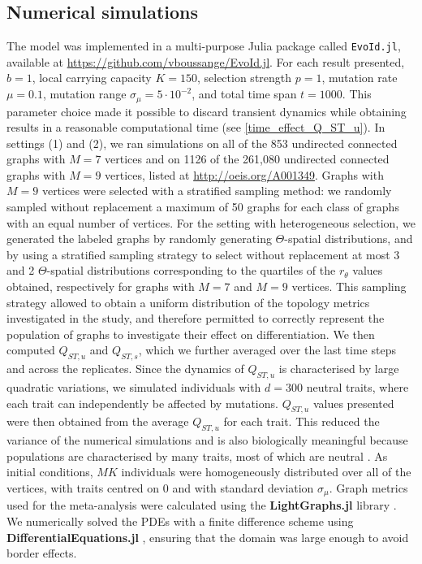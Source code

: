 \subsection{Numerical simulations}
The model was implemented in a multi-purpose Julia package called \texttt{EvoId.jl}, available at \href{https://github.com/vboussange/EvoId.jl}{https://github.com/vboussange/EvoId.jl}. For each result presented, $b = 1$, local carrying capacity $K = 150$, selection strength $p = 1$, mutation rate $\mu=0.1$, mutation range $\sigma_\mu = 5 \cdot 10^{-2}$, and total time span $t = 1000$. This parameter choice made it possible to discard transient dynamics while obtaining results in a reasonable computational time (see \cref{time_effect_Q_ST_u}).
%
In settings (1) and (2), we ran simulations on all of the 853 undirected connected graphs with $M=7$ vertices and on 1126 of the 261,080 undirected connected graphs with $M=9$ vertices, listed at \href{http://oeis.org/A001349}{http://oeis.org/A001349}. Graphs with $M = 9$ vertices were selected with a stratified sampling method: we randomly sampled without replacement a maximum of 50 graphs for each class of graphs with an equal number of vertices. For the setting with heterogeneous selection, we generated the labeled graphs by randomly generating $\Theta$-spatial distributions, and by using a stratified sampling strategy to select without replacement at most 3 and 2 $\Theta$-spatial distributions corresponding to the quartiles of the $r_\theta$ values obtained, respectively for graphs with $M=7$ and $M=9$ vertices. This sampling strategy allowed to obtain a uniform distribution of the topology metrics investigated in the study, and therefore permitted to correctly represent the population of graphs to investigate their effect on differentiation.
%
We then computed $Q_{ST,u}$ and $Q_{ST,s}$, which we further averaged over the last time steps and across the replicates.
%
Since the dynamics of $Q_{ST,u}$ is characterised by large quadratic variations, we simulated individuals with $d = 300$ neutral traits, where each trait can independently be affected by mutations. $Q_{ST,u}$ values presented were then obtained from the average $Q_{ST,u}$ for each trait. This reduced the variance of the numerical simulations and is also biologically meaningful because populations are characterised by many traits, most of which are neutral \citep{Holderegger2006}.
%
As initial conditions, $MK$ individuals were homogeneously distributed over all of the vertices, with traits centred on 0 and with standard deviation $\sigma_\mu$.
%
Graph metrics used for the meta-analysis were calculated using the \textbf{LightGraphs.jl} library \citep{Bromberger2017}. We numerically solved the PDEs with a finite difference scheme using \textbf{DifferentialEquations.jl} \citep{Rackauckas2017}, ensuring that the domain was large enough to avoid border effects.

